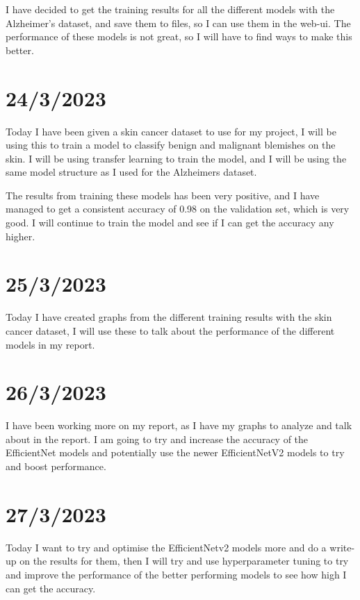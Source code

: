 \documentclass[]{final_report}
\begin{document}
I have decided to get the training results for all the different models with the Alzheimer's dataset, and save them to files, so I can use them in the web-ui. The performance of these models is not great, so I will have to find ways to make this better.


\section*{24/3/2023}

Today I have been given a skin cancer dataset to use for my project, I will be using this to train a model to classify benign and malignant blemishes on the skin. I will be using transfer learning to train the model, and I will be using the same model structure as I used for the Alzheimers dataset.

The results from training these models has been very positive, and I have managed to get a consistent accuracy of 0.98 on the validation set, which is very good. I will continue to train the model and see if I can get the accuracy any higher.

\section*{25/3/2023}

Today I have created graphs from the different training results with the skin cancer dataset, I will use these to talk about the performance of the different models in my report. 

\section*{26/3/2023}

I have been working more on my report, as I have my graphs to analyze and talk about in the report. I am going to try and increase the accuracy of the EfficientNet models and potentially use the newer EfficientNetV2 models to try and boost performance.

\section*{27/3/2023}

Today I want to try and optimise the EfficientNetv2 models more and do a write-up on the results for them, then I will try and use hyperparameter tuning to try and improve the performance of the better performing models to see how high I can get the accuracy.
\end{document}
